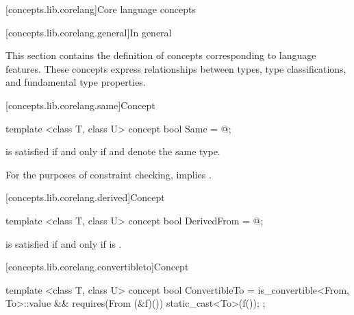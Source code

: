 [concepts.lib.corelang]{Core language concepts}

[concepts.lib.corelang.general]{In general}

\pnum
This section contains the definition of concepts corresponding to language features.
These concepts express relationships between types, type classifications, and
fundamental type properties.

[concepts.lib.corelang.same]{Concept }

%
\begin{itemdecl}
template <class T, class U>
concept bool Same = @\seebelow@;
\end{itemdecl}

\begin{itemdescr}
\pnum
{} is satisfied if and
only if  and  denote the same type.

\pnum
\remarks For the purposes of constraint checking,  implies
.
\end{itemdescr}

[concepts.lib.corelang.derived]{Concept }

%
\begin{itemdecl}
template <class T, class U>
concept bool DerivedFrom = @\seebelow@;
\end{itemdecl}

\begin{itemdescr}
\pnum
{} is satisfied if and only if
 is .
\end{itemdescr}

[concepts.lib.corelang.convertibleto]{Concept }

%
\begin{itemdecl}
template <class T, class U>
concept bool ConvertibleTo =
  is_convertible<From, To>::value &&
  requires(From (&f)()) {
    static_cast<To>(f());
  };
\end{itemdecl}

